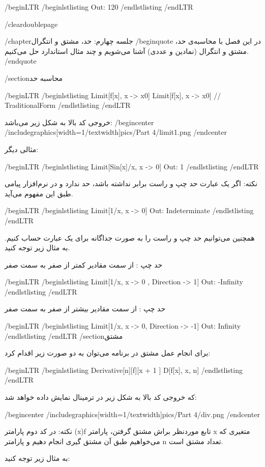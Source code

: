 /begin{LTR}
/begin{lstlisting}
Out: 120
/end{lstlisting}
/end{LTR}

/cleardoublepage

/chapter{جلسه چهارم: حد، مشتق و انتگرال}
/begin{quote}
در این فصل با محاسبه‌ی حد، مشتق و انتگرال (نمادین و عددی) آشنا می‌شویم و چند مثال استاندارد حل می‌کنیم.
/end{quote}


/section{محاسبه حد}

/begin{LTR}
/begin{lstlisting}
Limit[f[x], x -> x0]
Limit[f[x], x -> x0] // TraditionalForm
/end{lstlisting}
/end{LTR}

خروجی کد بالا به شکل زیر می‌باشد:
/begin{center}
/includegraphics[width=1/textwidth]{pics/Part 4/limit1.png}
/end{center}

مثالی دیگر:

/begin{LTR}
/begin{lstlisting}
Limit[Sin[x]/x, x -> 0]    Out: 1
/end{lstlisting}
/end{LTR}

نکته: اگر یک عبارت حد چپ و راست برابر نداشته باشد، حد ندارد و در نرم‌افزار پیامی طبق این مفهوم می‌آید.

/begin{LTR}
/begin{lstlisting}
Limit[1/x, x -> 0]         Out: Indeterminate
/end{lstlisting}
/end{LTR}

همچنین می‌توانیم حد چپ و راست را به صورت جداگانه برای یک عبارت حساب کنیم. به مثال زیر توجه کنید.

حد چپ : از سمت مقادیر کمتر از صفر به سمت صفر

/begin{LTR}
/begin{lstlisting}
Limit[1/x, x -> 0 , Direction -> 1]         Out: -Infinity
/end{lstlisting}
/end{LTR}

حد چپ : از سمت مقادیر بیشتر از صفر به سمت صفر

/begin{LTR}
/begin{lstlisting}
Limit[1/x, x -> 0, Direction -> -1]        Out: Infinity
/end{lstlisting}
/end{LTR}
/section{مشتق}

برای انجام عمل مشتق در برنامه می‌توان به دو صورت زیر اقدام کرد:

/begin{LTR}
/begin{lstlisting}
Derivative[n][f][x + 1 ]
D[f[x], {x, n}]
/end{lstlisting}
/end{LTR}

که خروجی کد بالا به شکل زیر در ترمینال نمایش داده خواهد شد:

/begin{center}
/includegraphics[width=1/textwidth]{pics/Part 4/div.png}
/end{center}

نکته: در کد دوم پارامتر (x)f تابع موردنظر براش مشتق گرفتن، پارامتر x متغیری که می‌خواهیم طبق آن مشتق گیری انجام دهیم و پارامتر n تعداد مشتق است.

به مثال زیر توجه کنید:

